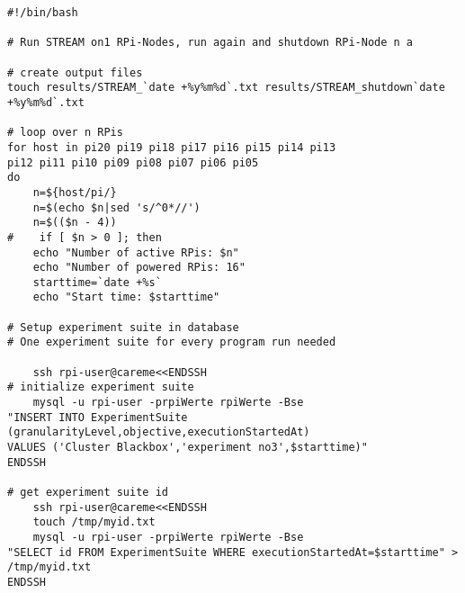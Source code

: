 \begin{verbatim}
#!/bin/bash                                                                           

# Run STREAM on1 RPi-Nodes, run again and shutdown RPi-Node n a

# create output files                                                                 
touch results/STREAM_`date +%y%m%d`.txt results/STREAM_shutdown`date +%y%m%d`.txt

# loop over n RPis 
for host in pi20 pi19 pi18 pi17 pi16 pi15 pi14 pi13 
pi12 pi11 pi10 pi09 pi08 pi07 pi06 pi05 
do
    n=${host/pi/}
    n=$(echo $n|sed 's/^0*//')
    n=$(($n - 4))
#    if [ $n > 0 ]; then 
	echo "Number of active RPis: $n"
	echo "Number of powered RPis: 16"
	starttime=`date +%s`
	echo "Start time: $starttime"

# Setup experiment suite in database                                                                                                                                        
# One experiment suite for every program run needed

	ssh rpi-user@careme<<ENDSSH
# initialize experiment suite                                                                                                                                               
	mysql -u rpi-user -prpiWerte rpiWerte -Bse 
"INSERT INTO ExperimentSuite (granularityLevel,objective,executionStartedAt) 
VALUES ('Cluster Blackbox','experiment no3',$starttime)"                                                                                                                                                              
ENDSSH

# get experiment suite id                                                                                                                                                   
	ssh rpi-user@careme<<ENDSSH                                                                                                                                                                                                                                                                                                                            
	touch /tmp/myid.txt                                                                                                                                                                                                                                                                                                                                 
	mysql -u rpi-user -prpiWerte rpiWerte -Bse 
"SELECT id FROM ExperimentSuite WHERE executionStartedAt=$starttime" > /tmp/myid.txt                                            
ENDSSH


\end{verbatim}
